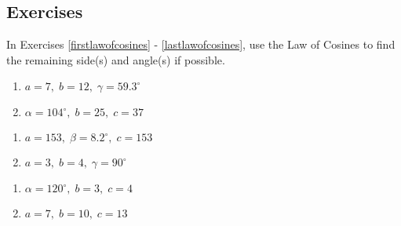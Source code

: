 \newpage

\subsection{Exercises}

In Exercises \ref{firstlawofcosines} - \ref{lastlawofcosines}, use the Law of Cosines to find the remaining side(s) and angle(s) if possible.

\begin{multicols}{2}

\begin{enumerate}

\item $a = 7, \; b = 12, \; \gamma = 59.3^{\circ}$ \label{firstlawofcosines}
\item $\alpha = 104^{\circ}, \; b = 25, \; c  = 37$

\setcounter{HW}{\value{enumi}}

\end{enumerate}

\end{multicols}

\begin{multicols}{2} 

\begin{enumerate}

\setcounter{enumi}{\value{HW}}

\item $a = 153, \; \beta = 8.2^{\circ}, \; c = 153$
\item $a = 3, \; b = 4, \; \gamma = 90^{\circ}$

\setcounter{HW}{\value{enumi}}

\end{enumerate}

\end{multicols}

\begin{multicols}{2} 

\begin{enumerate}

\setcounter{enumi}{\value{HW}}

\item $\alpha = 120^{\circ}, \; b = 3, \; c = 4$
\item $a = 7, \; b = 10, \; c = 13$ \label{firstherons}

\setcounter{HW}{\value{enumi}}

\end{enumerate}

\end{multicols}

